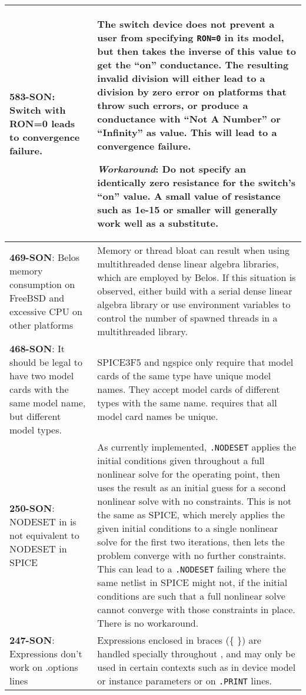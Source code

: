 {\begin{longtable}[h] {>{\raggedright\small}m{2in}|>{\raggedright\let\\\tabularnewline\small}m{3.5in}}
\textbf{583-SON}: Switch with RON=0 leads to convergence failure. &
The switch device does not prevent a user from
specifying \texttt{RON=0} in its model, but then takes the inverse of
this value to get the ``on'' conductance.  The resulting invalid
division will either lead to a division by zero error on platforms
that throw such errors, or produce a conductance with ``Not A Number''
or ``Infinity'' as value.  This will lead to a convergence failure.

\textbf{\textit{Workaround}}: Do not specify an identically zero resistance
for the switch's ``on'' value.  A small value of resistance such as
1e-15 or smaller will generally work well as a substitute. \\ \hline


\textbf{469-SON}: Belos memory consumption on FreeBSD and excessive CPU on other
platforms & Memory or thread bloat can result when using multithreaded
dense linear algebra libraries, which are employed by Belos.  If this
situation is observed, either build
\Xyce{} with a serial dense linear algebra library or use environment variables
to control the number of spawned threads in a multithreaded library.
\\ \hline


\textbf{468-SON}: It should be legal to have two model cards with the same model
name, but different model types. & SPICE3F5 and ngspice only require
that model cards of the same type have unique model names. They accept
model cards of different types with the same name.  \Xyce{} requires
that all model card names be unique.
\\ \hline


\textbf{250-SON}: NODESET in \Xyce{} is not equivalent to NODESET in SPICE & As
currently implemented, \texttt{.NODESET} applies the initial
conditions given throughout a full nonlinear solve for the operating
point, then uses the result as an initial guess for a second nonlinear
solve with no constraints.  This is not the same as SPICE, which
merely applies the given initial conditions to a single nonlinear
solve for the first two iterations, then lets the problem converge
with no further constraints.  This can lead to
a \Xyce{} \texttt{.NODESET} failing where the same netlist in SPICE
might not, if the initial conditions are such that a full nonlinear
solve cannot converge with those constraints in place.  There is no
workaround.
\\ \hline

\textbf{247-SON}: Expressions don't work on .options lines & Expressions
enclosed in braces (\{ \}) are handled specially throughout \Xyce{},
and may only be used in certain contexts such as in device model or
instance parameters or on \texttt{.PRINT} lines.
\\ \hline



\end{longtable}}
